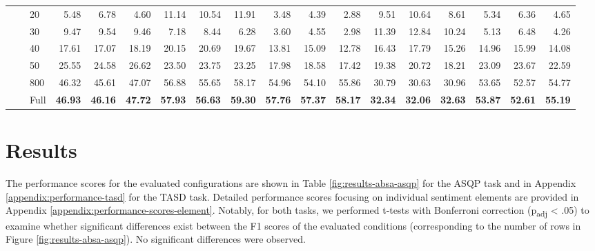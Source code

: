 \begin{table*}[!h]
{\begin{tabular}{lllrrr|rrr|rrr|rrr|rrr}
 \textbf{} & \textbf{} & 20 & 5.48 & 6.78 & 4.60 & 11.14 & 10.54 & 11.91 & 3.48 & 4.39 & 2.88 & 9.51 & 10.64 & 8.61 & 5.34 & 6.36 & 4.65 \\ 
 \textbf{} & \textbf{} & 30 & 9.47 & 9.54 & 9.46 & 7.18 & 8.44 & 6.28 & 3.60 & 4.55 & 2.98 & 11.39 & 12.84 & 10.24 & 5.13 & 6.48 & 4.26 \\ 
 \textbf{} & \textbf{} & 40 & 17.61 & 17.07 & 18.19 & 20.15 & 20.69 & 19.67 & 13.81 & 15.09 & 12.78 & 16.43 & 17.79 & 15.26 & 14.96 & 15.99 & 14.08 \\ 
 \textbf{} & \textbf{} & 50 & 25.55 & 24.58 & 26.62 & 23.50 & 23.75 & 23.25 & 17.98 & 18.58 & 17.42 & 19.38 & 20.72 & 18.21 & 23.09 & 23.67 & 22.59 \\ 
 \textbf{} & \textbf{} & 800 & 46.32 & 45.61 & 47.07 & 56.88 & 55.65 & 58.17 & 54.96 & 54.10 & 55.86 & 30.79 & 30.63 & 30.96 & 53.65 & 52.57 & 54.77 \\ 
 \textbf{} & \textbf{} & Full & \textbf{46.93} & \textbf{46.16} & \textbf{47.72} & \textbf{57.93} & \textbf{56.63} & \textbf{59.30} & \textbf{57.76} & \textbf{57.37} & \textbf{58.17} & \textbf{32.34} & \textbf{32.06} & \textbf{32.63} & \textbf{53.87} & \textbf{52.61} & \textbf{55.19} \\ 
\hline
\end{tabular}
}
\caption{Performance scores for ASQP. For the Rest15 and Rest16 datasets, performance scores achieved when employing the full training set ("Full") are taken from \citet{gou2023mvp}, \citet{hu2022improving} and \citet{zhang2021towards} for MVP, DLO and Paraphrase, respectively. The best score achieved by a method is presented in bold.}\label{fig:results-absa-asqp}
\end{table*}


\section{Results}

The performance scores for the evaluated configurations are shown in Table \ref{fig:results-absa-asqp} for the ASQP task and in Appendix \ref{appendix:performance-tasd} for the TASD task. Detailed performance scores focusing on individual sentiment elements are provided in Appendix \ref{appendix:performance-scores-element}. Notably, for both tasks, we performed t-tests with Bonferroni correction (p\textsubscript{adj} < .05) to examine whether significant differences exist between the F1 scores of the evaluated conditions (corresponding to the number of rows in Figure \ref{fig:results-absa-asqp}). No significant differences were observed.

